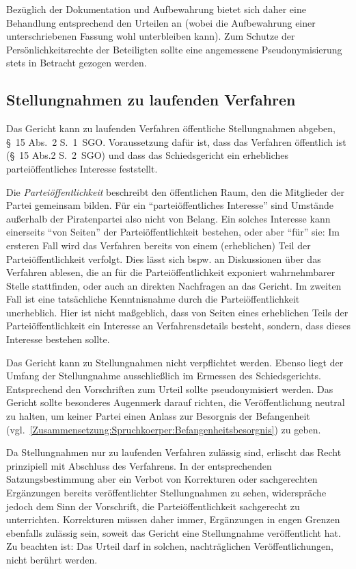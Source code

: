 Bezüglich der Dokumentation und Aufbewahrung bietet sich daher eine Behandlung entsprechend den Urteilen an (wobei die Aufbewahrung einer unterschriebenen Fassung wohl unterbleiben kann).
Zum Schutze der Persönlichkeitsrechte der Beteiligten sollte eine angemessene Pseudonymisierung stets in Betracht gezogen werden.

\subsection{Stellungnahmen zu laufenden Verfahren}
\label{Dokumentation:Veröffentlichungen:Stellungnahmen}
Das Gericht kann zu laufenden Verfahren öffentliche Stellungnahmen abgeben, \S~15 Abs.~2 S.~1~SGO.
Voraussetzung dafür ist, dass das Verfahren öffentlich ist (\S~15 Abs.2 S.~2~SGO) und dass das Schiedsgericht ein erhebliches parteiöffentliches Interesse feststellt.

Die \emph{Parteiöffentlichkeit} beschreibt den öffentlichen Raum, den die Mitglieder der Partei gemeinsam bilden.
Für ein \enquote{parteiöffentliches Interesse} sind Umstände außerhalb der Piratenpartei also nicht von Belang.
Ein solches Interesse kann einerseits \enquote{von Seiten} der Parteiöffentlichkeit bestehen, oder aber \enquote{für} sie:
Im ersteren Fall wird das Verfahren bereits von einem (erheblichen) Teil der Parteiöffentlichkeit verfolgt.
Dies lässt sich bspw. an Diskussionen über das Verfahren ablesen, die an für die Parteiöffentlichkeit exponiert wahrnehmbarer Stelle stattfinden, oder auch an direkten Nachfragen an das Gericht.
Im zweiten Fall ist eine tatsächliche Kenntnisnahme durch die Parteiöffentlichkeit unerheblich.
Hier ist nicht maßgeblich, dass von Seiten eines erheblichen Teils der Parteiöffentlichkeit ein Interesse an Verfahrensdetails besteht, sondern, dass dieses Interesse bestehen sollte.

Das Gericht kann zu Stellungnahmen nicht verpflichtet werden.
Ebenso liegt der Umfang der Stellungnahme ausschließlich im Ermessen des Schiedsgerichts.
Entsprechend den Vorschriften zum Urteil sollte pseudonymisiert werden.
Das Gericht sollte besonderes Augenmerk darauf richten, die Veröffentlichung neutral zu halten, um keiner Partei einen Anlass zur Besorgnis der Befangenheit (vgl.~\ref{Zusammensetzung:Spruchkoerper:Befangenheitsbesorgnis}) zu geben.

Da Stellungnahmen nur zu laufenden Verfahren zulässig sind, erlischt das Recht prinzipiell mit Abschluss des Verfahrens.
In der entsprechenden Satzungsbestimmung aber ein Verbot von Korrekturen oder sachgerechten Ergänzungen bereits veröffentlichter Stellungnahmen zu sehen, widerspräche jedoch dem Sinn der Vorschrift, die Parteiöffentlichkeit sachgerecht zu unterrichten.
Korrekturen müssen daher immer, Ergänzungen in engen Grenzen ebenfalls zulässig sein, soweit das Gericht eine Stellungnahme veröffentlicht hat.
Zu beachten ist:
Das Urteil darf in solchen, nachträglichen Veröffentlichungen, nicht berührt werden.

